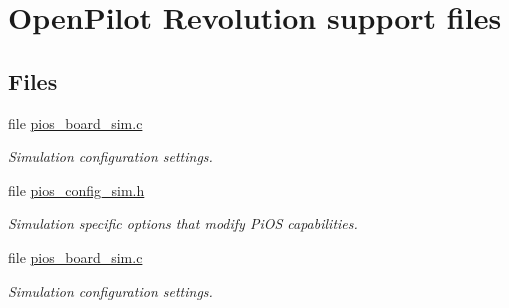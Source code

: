 \hypertarget{group___revolution}{\section{\-Open\-Pilot \-Revolution support files}
\label{group___revolution}
}
\subsection*{\-Files}
\begin{DoxyCompactItemize}
\item 
file \hyperlink{pios__board__sim_8c}{pios\-\_\-board\-\_\-sim.\-c}
\begin{DoxyCompactList}\small\item\em \-Simulation configuration settings. \end{DoxyCompactList}\item 
file \hyperlink{pios__config__sim_8h}{pios\-\_\-config\-\_\-sim.\-h}
\begin{DoxyCompactList}\small\item\em \-Simulation specific options that modify \-Pi\-O\-S capabilities. \end{DoxyCompactList}\item 
file \hyperlink{pios__board__sim_8c}{pios\-\_\-board\-\_\-sim.\-c}
\begin{DoxyCompactList}\small\item\em \-Simulation configuration settings. \end{DoxyCompactList}\end{DoxyCompactItemize}
